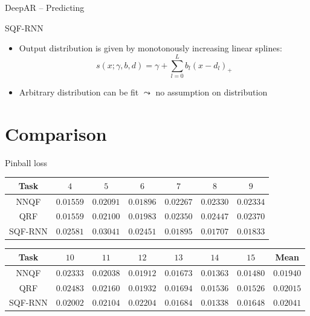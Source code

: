 \documentclass[10pt,aspectratio=169]{beamer}
\begin{document}
\begin{frame}[fragile]{DeepAR -- Predicting}
    \begin{center}
        
    \end{center}
    \begin{itemize}
    \end{itemize}
\end{frame}

\begin{frame}{SQF-RNN}
    \begin{itemize}
        \item Output distribution is given by monotonously increasing linear splines: 
        \[ s(x; \gamma, b, d) = \gamma + \sum_{l=0}^L b_l (x - d_l)_+ \]
        \item Arbitrary distribution can be fit \(\leadsto\) no assumption on distribution
    \end{itemize}
\end{frame}

\section{Comparison}

\begin{frame}[fragile]{Pinball loss}
    \renewcommand{\b}[1]{\mathbf{#1}}
    \begin{tabular}{c|cccccc}
        Task & \(4\) & \(5\) & \(6\) & \(7\) & \(8\) & \(9\) \\
        \hline
        NNQF    & \(\b{0.01559}\) & \(\b{0.02091}\) & \(\b{0.01896}\) & \(0.02267\)     & \(0.02330\)     & \(0.02334\)     \\
        QRF     & \(0.01559\)     & \(0.02100\)     & \(0.01983\)     & \(0.02350\)     & \(0.02447\)     & \(0.02370\)     \\
        SQF-RNN & \(0.02581\)     & \(0.03041\)     & \(0.02451\)     & \(\b{0.01895}\) & \(\b{0.01707}\) & \(\b{0.01833}\)
    \end{tabular}
    \begin{tabular}{c|cccccc|c}
        Task & \(10\) & \(11\) & \(12\) & \(13\) & \(14\) & \(15\) & Mean \\
        \hline
        NNQF    & \(0.02333\)     & \(\b{0.02038}\) & \(\b{0.01912}\) & \(\b{0.01673}\) & \(\b{0.01363}\) & \(\b{0.01480}\) & \(\b{0.01940}\) \\
        QRF     & \(0.02483\)     & \(0.02160\)     & \(0.01932\)     & \(0.01694\)     & \(0.01536\)     & \(0.01526\)     & \(0.02015\)     \\
        SQF-RNN & \(\b{0.02002}\) & \(0.02104\)     & \(0.02204\)     & \(0.01684\)     & \(0.01338\)     & \(0.01648\)     & \(0.02041\)
    \end{tabular}
\end{frame}
\end{document}
